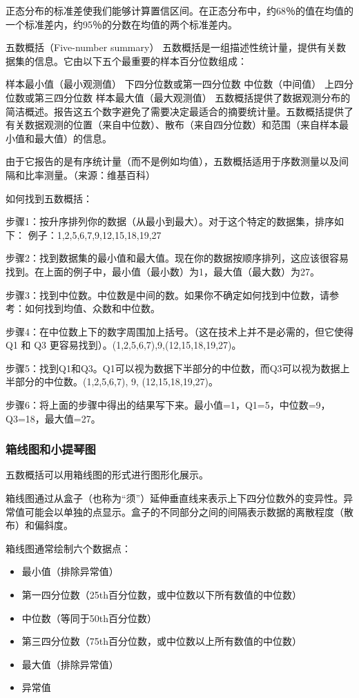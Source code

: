 \documentclass[]{book}
\providecommand{\tightlist}{%
  \setlength{\itemsep}{0pt}\setlength{\parskip}{0pt}}
\begin{document}
正态分布的标准差使我们能够计算置信区间。在正态分布中，约68％的值在均值的一个标准差内，约95％的分数在均值的两个标准差内。

五数概括（Five-number summary）
五数概括是一组描述性统计量，提供有关数据集的信息。它由以下五个最重要的样本百分位数组成：

样本最小值（最小观测值）
下四分位数或第一四分位数
中位数（中间值）
上四分位数或第三四分位数
样本最大值（最大观测值）
五数概括提供了数据观测分布的简洁概述。报告这五个数字避免了需要决定最适合的摘要统计量。五数概括提供了有关数据观测的位置（来自中位数）、散布（来自四分位数）和范围（来自样本最小值和最大值）的信息。

由于它报告的是有序统计量（而不是例如均值），五数概括适用于序数测量以及间隔和比率测量。（来源：维基百科）

如何找到五数概括：

步骤1：按升序排列你的数据（从最小到最大）。对于这个特定的数据集，排序如下：
例子：1,2,5,6,7,9,12,15,18,19,27

步骤2：找到数据集的最小值和最大值。现在你的数据按顺序排列，这应该很容易找到。在上面的例子中，最小值（最小数）为1，最大值（最大数）为27。

步骤3：找到中位数。中位数是中间的数。如果你不确定如何找到中位数，请参考：如何找到均值、众数和中位数。

步骤4：在中位数上下的数字周围加上括号。（这在技术上并不是必需的，但它使得 Q1 和 Q3 更容易找到）。(1,2,5,6,7),9,(12,15,18,19,27)。

步骤5：找到Q1和Q3。Q1可以视为数据下半部分的中位数，而Q3可以视为数据上半部分的中位数。(1,2,5,6,7), 9, (12,15,18,19,27)。

步骤6：将上面的步骤中得出的结果写下来。最小值=1，Q1=5，中位数=9，Q3=18，最大值=27。

\hypertarget{ux7bb1ux7ebfux56feux548cux5c0fux63d0ux7434ux56fe}{%
\subsubsection{箱线图和小提琴图}\label{ux7bb1ux7ebfux56feux548cux5c0fux63d0ux7434ux56fe}}

五数概括可以用箱线图的形式进行图形化展示。

箱线图通过从盒子（也称为``须''）延伸垂直线来表示上下四分位数外的变异性。异常值可能会以单独的点显示。盒子的不同部分之间的间隔表示数据的离散程度（散布）和偏斜度。

箱线图通常绘制六个数据点：

\begin{itemize}
\tightlist
\item
  最小值（排除异常值）
\item
  第一四分位数（25th百分位数，或中位数以下所有数值的中位数）
\item
  中位数（等同于50th百分位数）
\item
  第三四分位数（75th百分位数，或中位数以上所有数值的中位数）
\item
  最大值（排除异常值）
\item
  异常值
\end{itemize}
\end{document}
